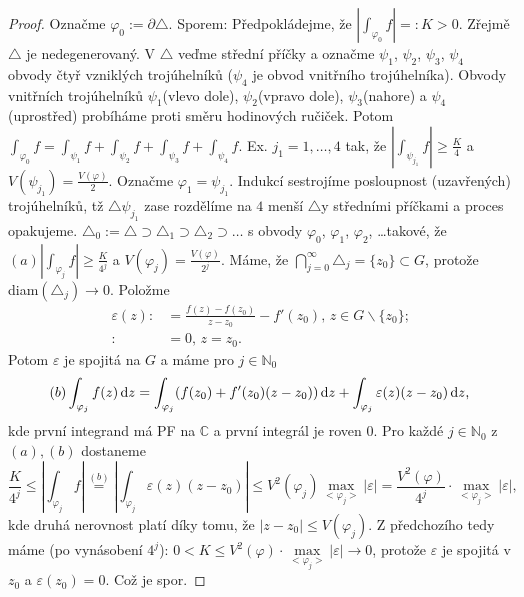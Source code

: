 \begin{proof}
Označme $\varphi_0:=\partial\triangle$. Sporem: Předpokládejme, že $|\int_{\varphi_0}f|=:K>0$. Zřejmě $\triangle$ je nedegenerovaný. V  $\triangle$ veďme střední příčky a označme $\psi_1$, $\psi_2$, $\psi_3$, $\psi_4$ obvody čtyř vzniklých trojúhelníků ($\psi_4$ je obvod vnitřního trojúhelníka). Obvody vnitřních trojúhelníků $\psi_1$(vlevo dole),  $\psi_2$(vpravo dole), $\psi_3$(nahore) a  $\psi_4$(uprostřed) probíháme proti směru hodinových ručiček.
Potom $\int_{\varphi_0}f=\int_{\psi_1}f+\int_{\psi_2}f+\int_{\psi_3}f+\int_{\psi_4}f$. Ex. $j_1=1, \ldots, 4$ tak, že $|\int_{\psi_{j_1}}f|\ge \frac{K}{4}$ a $V({\psi_{j_1}})= \frac{V(\varphi)}{2}$.
Označme $\varphi_1=\psi_{j_1}$. Indukcí sestrojíme posloupnost (uzavřených) trojúhelníků, tž $\triangle \psi_{j_1}$ zase rozdělíme na $4$ menší $\triangle$y středními příčkami a proces opakujeme.
$\triangle_0:=\triangle \supset \triangle_1 \supset \triangle_2 \supset \ldots$ s obvody $\varphi_0$, $\varphi_1$, $\varphi_2$, \ldots takové, že $(a) |\int_{\varphi_j}f|\ge \frac{K}{4^j}$ a $V({\varphi_j})= \frac{V(\varphi)}{2^j}$. Máme, že $\bigcap\limits_{j=0}^\infty \triangle_j=\{z_0\} \subset G$,%
protože diam$(\triangle_j)\rightarrow 0$. Položme
$$\begin{aligned}
\varepsilon(z): &= \frac{f(z)-f(z_0)}{z-z_0}-f'(z_0) \text{, } z \in G \backslash \{z_0\} \text{;} \\ %
: &= 0  \text{, } z=z_0 \text{.}
\end{aligned}
$$
Potom $\varepsilon$ je spojitá na $G$ a máme pro $j \in \mathbb{N}_0$
$$
(b) \int_{\varphi_j}f(z) \mathop{}\!\mathrm{d} z = \int_{\varphi_j}(f(z_0)+f'(z_0)(z-z_0)) \mathop{}\!\mathrm{d} z + \int_{\varphi_j}\varepsilon(z)(z-z_0) \mathop{}\!\mathrm{d} z \text{,}
$$
kde první integrand má PF na $\mathbb{C}$ a první integrál je roven $0$. Pro každé $j \in \mathbb{N}_0$ z $(a), (b)$ dostaneme
$$
\frac{K}{4^j} \le \left| \int_{\varphi_j}f\right|\stackrel{(b)}{=} \left|\int_{\varphi_j}\varepsilon(z)(z-z_0)\right| \le V^2(\varphi_j) \max_{<\varphi_j>}|\varepsilon|=\frac{V^2(\varphi)}{4^j}\cdot \max_{<\varphi_j>}|\varepsilon| \text{,}
$$
kde druhá nerovnost platí díky tomu, že $|z-z_0| \le V(\varphi_j)$. Z předchozího tedy máme (po vynásobení $4^j$): $0<K \le V^2(\varphi) \cdot \max\limits_{<\varphi_j>}|\varepsilon| \rightarrow 0$, protože $\varepsilon$ je spojitá v $z_0$ a $\varepsilon(z_0)=0$. Což je spor.
\end{proof}

